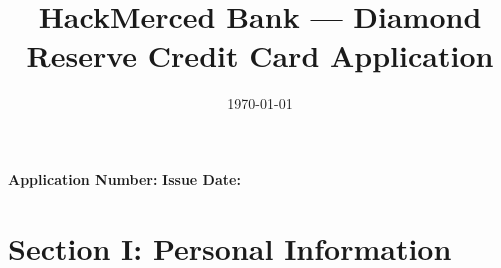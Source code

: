 \documentclass[12pt,a4paper]{article}
\begin{document}
\title{\textbf{HackMerced Bank --- Diamond Reserve Credit Card Application}}
\author{}
\date{\today}
\maketitle

\thispagestyle{empty}

\begin{center}
\textbf{Application Number:} \underline{\hspace{2in}} \hspace{1cm}
\textbf{Issue Date:} \underline{\hspace{1.5in}}
\end{center}

\vspace{1cm}

\section*{Section I: Personal Information}
\end{document}
